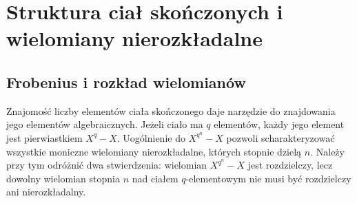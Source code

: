 \chapter[Wielomiany nad ciałami skończonymi]{Struktura ciał skończonych i wielomiany nierozkładalne}
\label{aa:ch:finite-fields-structure}

\section{Frobenius i rozkład wielomianów}

Znajomość liczby elementów ciała skończonego daje narzędzie do
znajdowania jego elementów algebraicznych. Jeżeli ciało ma $q$
elementów, każdy jego element jest pierwiastkiem $X^q-X$.
Uogólnienie do $X^{q^n}-X$ pozwoli scharakteryzować wszystkie
moniczne wielomiany nierozkładalne, których stopnie dzielą $n$.
Należy przy tym odróżnić dwa stwierdzenia: wielomian
$X^{q^n}-X$ jest rozdzielczy, lecz dowolny wielomian
stopnia $n$ nad ciałem $q$-elementowym nie musi być rozdzielczy
ani nierozkładalny.

